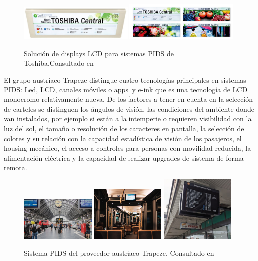 \begin{figure}[h]
	\centering
	\includegraphics[width=0.49\textwidth]{./Figures/ToshibaPIDS.jpg}
	\includegraphics[width=0.49\textwidth]{./Figures/ToshibaDisplayColorOpciones.jpg}
	\caption{Solución de displays LCD para sistemas PIDS de Toshiba.Consultado en \citep{Toshiba}}
	\label{fig:Toshiba}
\end{figure}


El grupo austríaco Trapeze \citep{Trapeze} distingue cuatro tecnologías principales en sistemas PIDS: Led, LCD, canales móviles o apps, y e-ink que es una tecnología de LCD monocromo relativamente nueva. De los factores a tener en cuenta en la selección de carteles se distinguen los ángulos de visión, las condiciones del ambiente donde van instalados, por ejemplo si están a la intemperie o requieren visibilidad con la luz del sol, el tamaño o resolución de los caracteres en pantalla, la selección de colores y su relación con la capacidad estadística de visión de los pasajeros, el housing mecánico, el acceso a controles para personas con movilidad reducida, la alimentación eléctrica y la capacidad de realizar upgrades de sistema de forma remota. \\ 


\begin{figure}[h]
	\centering
	\includegraphics[width=0.32\textwidth]{./Figures/TrapezeStation.jpg}
	\includegraphics[width=0.32\textwidth]{./Figures/TrapezeOnboard.jpg}
	\includegraphics[width=0.32\textwidth]{./Figures/TrapezeTimetable.jpg}
	\caption{Sistema PIDS del proveedor austríaco Trapeze. Consultado en \citep{Trapeze}}
	\label{fig:Trapeze}
\end{figure}

